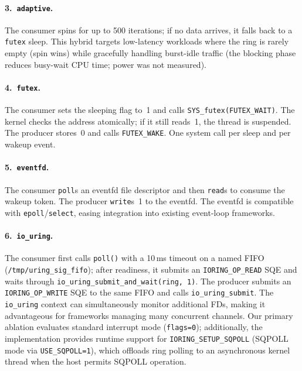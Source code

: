 \documentclass[10pt,conference]{IEEEtran}
\begin{document}
\paragraph{3.~\texttt{adaptive}.}
The consumer spins for up to 500 iterations; if no data arrives, it falls back
to a \texttt{futex} sleep.  This hybrid targets low-latency workloads where the
ring is rarely empty (spin wins) while gracefully handling burst-idle traffic
(the blocking phase reduces busy-wait CPU time; power was not measured).

\paragraph{4.~\texttt{futex}.}
The consumer sets the sleeping flag to~1 and calls
\texttt{SYS\-\_futex(FUTEX\-\_WAIT)}.  The kernel checks the address
atomically; if it still reads~1, the thread is suspended.  The producer
stores~0 and calls \texttt{FUTEX\-\_WAKE}.  One system call per sleep
and per wakeup event.

\paragraph{5.~\texttt{eventfd}.}
The consumer \texttt{poll}s an eventfd file descriptor and then \texttt{read}s
to consume the wakeup token.  The producer \texttt{write}s~1 to the eventfd.
The eventfd is compatible with \texttt{epoll}/\texttt{select}, easing
integration into existing event-loop frameworks.

\paragraph{6.~\texttt{io\_uring}.}
The consumer first calls \texttt{poll()} with a 10\,ms timeout on a named
FIFO (\texttt{/tmp/\allowbreak uring\-\_sig\-\_fifo}); after readiness, it
submits an \texttt{IORING\-\_OP\-\_READ} SQE and waits through
\texttt{io\-\_uring\-\_submit\-\_and\-\_wait\-(ring,~1)}.  The
producer submits an \texttt{IORING\-\_OP\-\_WRITE} SQE to the same FIFO
and calls \texttt{io\-\_uring\-\_submit}.  The \texttt{io\-\_uring}
context can simultaneously monitor additional FDs, making it advantageous
for frameworks managing many concurrent channels.  Our primary ablation evaluates
standard interrupt mode (\texttt{flags=0}); additionally, the implementation provides
runtime support for \texttt{IORING\_SETUP\_SQPOLL} (SQPOLL mode via \texttt{USE\_SQPOLL=1}),
which offloads ring polling to an asynchronous kernel thread when the host
permits SQPOLL operation.
\end{document}
